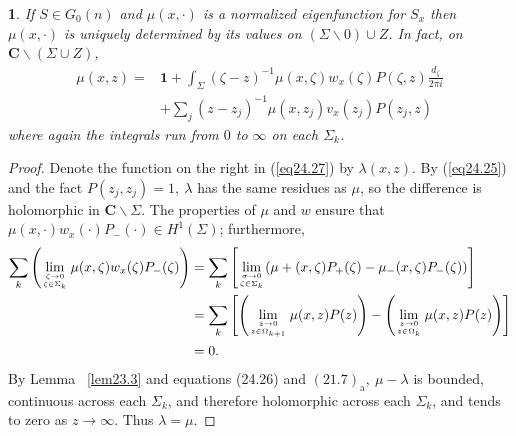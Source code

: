 \documentclass{surv-l}
\theoremstyle{plain}
\newtheorem{prop}[theorem]{\sc{Proposition}}
\theoremstyle{definition}
\numberwithin{equation}{chapter}
\begin{document}
\setcounter{theorem}{25}
\begin{prop}\label{prop24.26}
If $S\in G_{0}(n)$ and $\mu(x, \cdot)$ is a normalized eigenfunction for $S_{x}$ then $\mu(x, \cdot)$ is uniquely determined by its values on $(\Sigma\backslash 0)\cup Z$. In fact, on $\mathbf{C}\backslash (\Sigma\cup Z)$,
\renewcommand{\theequation}{\thesection.\arabic{equation}}
\setcounter{section}{24}
\setcounter{equation}{26}
\begin{align}\label{eq24.27}
\mu(x, z)= & \mathbf{1}+\int_{\Sigma}(\zeta-z)^{-1}\mu(x, \zeta)w_{x}(\zeta)P(\zeta, z)\frac{d_{\zeta}}{2\pi i}\\
& +\sum_{j}(z-z_{j})^{-1}\mu(x, z_{j})v_{x}(z_{j})P(z_{j}, z) \nonumber
\end{align}
where again the integrals run from $0$ to $\infty$ on each $\Sigma_{k}$.
\end{prop}
\begin{proof}
Denote the function on the right in (\ref{eq24.27}) by $\lambda(x, z)$. By (\ref{eq24.25}) and the fact $P(z_{j},z_{j})=1,\ \lambda$ has the same residues as $\mu$, so the difference is holomorphic in $\textbf{C}\backslash \Sigma$. The properties of $\mu$ and $w$ ensure that $\mu(x, \cdot)w_{x}(\cdot)P_{-}(\cdot)\in H^{1}(\Sigma)$; furthermore,
\begin{align*}
\sum_{k}\left(\lim_{{\zeta\rightarrow 0}\atop{\zeta\in \Sigma_{k}}} \mu(x,\zeta)w_{x}(\zeta)P_{-}  (\zeta)\right) &= \sum_{k}\left[\lim_{{\sigma\rightarrow 0}\atop{\zeta\in \Sigma_{k}}}(\mu+(x, \zeta)P_{+}(\zeta)-\mu_{-}(x, \zeta)P_{-}(\zeta))\right]\\
& =\sum_{k} \left[  \left(\lim_{{z\rightarrow0}\atop{z\in\Omega_{k+1}}}\mu(x,z)P(z)\right) - \left(\lim_{{z\rightarrow 0}\atop{z\in\Omega_{k}}}\mu(x, z)P(z)\right) \right]\\
& =0.
\end{align*}
By Lemma ~\ref{lem23.3} and equations (24.26) and $(21.7)_{\mathrm{a}},\ \mu-\lambda$ is bounded, continuous across each $\Sigma_{k}$, and therefore holomorphic across each $\Sigma_{k}$, and tends to zero as $z\rightarrow\infty$. Thus $\lambda=\mu$.
\end{proof}
\end{document}
